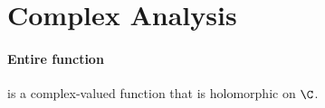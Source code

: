
\section{Complex Analysis}\label{f28d4dc}

\paragraph{Entire function} is a complex-valued function that is holomorphic
on $\C$.
